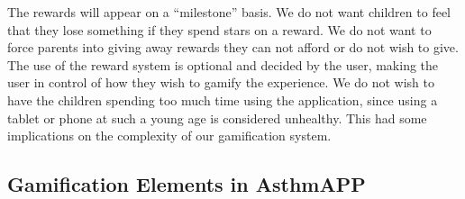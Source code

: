The rewards will appear on a ``milestone'' basis. We do not want children to feel that they lose something if they spend stars on a reward. We do not want to force parents into giving away rewards they can not afford or do not wish to give. The use of the reward system is optional and decided by the user, making the user in control of how they wish to gamify the experience. 
We do not wish to have the children spending too much time using the application, since using a tablet or phone at such a young age is considered unhealthy. This had some implications on the complexity of our gamification system. 


\subsection{Gamification Elements in AsthmAPP}
\label{sec:combininggamemechanismsinasthmapp}

